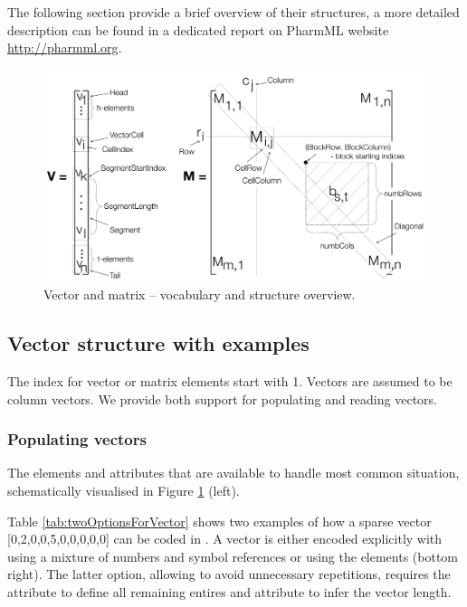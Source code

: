 The following section provide a brief overview of their structures, a more detailed 
description can be found in a dedicated report on PharmML website \url{http://pharmml.org}.

\begin{figure}[htbp]
\centering
 \includegraphics[width=170mm]{pics/VectorMatrixStructure}
\caption{Vector and matrix -- vocabulary and structure overview.}
\label{fig:vectorMatrix}
\end{figure}



\subsection{Vector structure with examples}
\label{subsec:vectorType}
The index for vector or matrix elements start with 1. Vectors are assumed to 
be column vectors. We provide both support for populating and reading 
vectors. 

\subsubsection{Populating vectors}
The elements and attributes that are available to handle most common situation,
schematically visualised in Figure \ref{fig:vectorMatrix} (left).

Table \ref{tab:twoOptionsForVector} shows two examples of how a sparse vector 
[0,2,0,0,5,0,0,0,0,0] can be coded in \pharmml. A vector is either 
encoded explicitly with  using a mixture of numbers 
and symbol references or using the  elements (bottom right). 
The latter option, allowing to avoid unnecessary repetitions, requires the 
 attribute to define all remaining entires and  attribute 
to infer the vector length.

